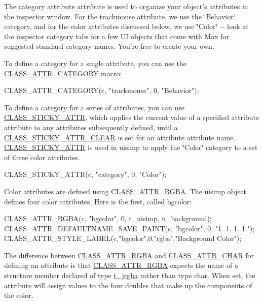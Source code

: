 The category attribute attribute is used to organize your object's attributes in the inspector window. For the trackmouse attribute, we use the \char`\"{}Behavior\char`\"{} category, and for the color attributes discussed below, we use \char`\"{}Color\char`\"{} -\/-\/ look at the inspector category tabs for a few UI objects that come with Max for suggested standard category names. You're free to create your own.

To define a category for a single attribute, you can use the \hyperlink{group__attr_ga1bae4d6ba42e2a7cc9e1bc648ccfb421}{CLASS\_\-ATTR\_\-CATEGORY} macro:


\begin{DoxyCode}
    CLASS_ATTR_CATEGORY(c, "trackmouse", 0, "Behavior");
\end{DoxyCode}


To define a category for a series of attributes, you can use \hyperlink{group__attr_ga51ce88a6d20e819ad703514e583e5562}{CLASS\_\-STICKY\_\-ATTR}, which applies the current value of a specified attribute attribute to any attributes subsequently defined, until a \hyperlink{group__attr_gadf3ca4c22b0273a96f5644788489970b}{CLASS\_\-STICKY\_\-ATTR\_\-CLEAR} is set for an attribute attribute name. \hyperlink{group__attr_ga51ce88a6d20e819ad703514e583e5562}{CLASS\_\-STICKY\_\-ATTR} is used in uisimp to apply the \char`\"{}Color\char`\"{} category to a set of three color attributes.


\begin{DoxyCode}
    CLASS_STICKY_ATTR(c, "category", 0, "Color");
\end{DoxyCode}


Color attributes are defined using \hyperlink{group__attr_ga24f3c54d0847a6e117a3a48beb44efac}{CLASS\_\-ATTR\_\-RGBA}. The uisimp object defines four color attributes. Here is the first, called bgcolor:


\begin{DoxyCode}
    CLASS_ATTR_RGBA(c, "bgcolor", 0, t_uisimp, u_background); 
    CLASS_ATTR_DEFAULTNAME_SAVE_PAINT(c, "bgcolor", 0, "1. 1. 1. 1."); 
    CLASS_ATTR_STYLE_LABEL(c,"bgcolor",0,"rgba","Background Color");
\end{DoxyCode}


The difference between \hyperlink{group__attr_ga24f3c54d0847a6e117a3a48beb44efac}{CLASS\_\-ATTR\_\-RGBA} and \hyperlink{group__attr_ga155d0006cea5a22fe0832a9fa52b2814}{CLASS\_\-ATTR\_\-CHAR} for defining an attribute is that \hyperlink{group__attr_ga24f3c54d0847a6e117a3a48beb44efac}{CLASS\_\-ATTR\_\-RGBA} expects the name of a structure member declared of type \hyperlink{structt__jrgba}{t\_\-jrgba} rather than type char. When set, the attribute will assign values to the four doubles that make up the components of the color.

